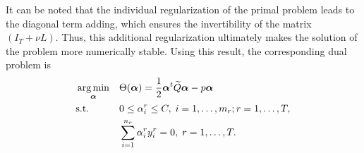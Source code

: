 It can be noted that the individual regularization of the primal problem leads to the diagonal term adding, which ensures the invertibility of the matrix $(I_T + \nu L)$.
Thus, this additional regularization ultimately makes the solution of the problem more numerically stable.
Using this result, the corresponding dual problem is
\begin{equation}\label{eq:linear_gl_dual}
    \begin{aligned}
        & \argmin_{\fv{\alpha}} 
        & & \Theta(\fv{\alpha}) = \frac{1}{2} \fv{\alpha}^t \widetilde{Q} \fv{\alpha} - p \fv{\alpha} \\
        & \text{s.t.}
        & & 0 \leq \alpha_i^r \leq C, \;  i=1,\ldots,m_r; r=1,\ldots,T , \\
        & & & \sum_{i=1}^{n_r}{\alpha_i^r y_i^r} = 0, \; r=1,\ldots,T .
        \end{aligned}
\end{equation}

